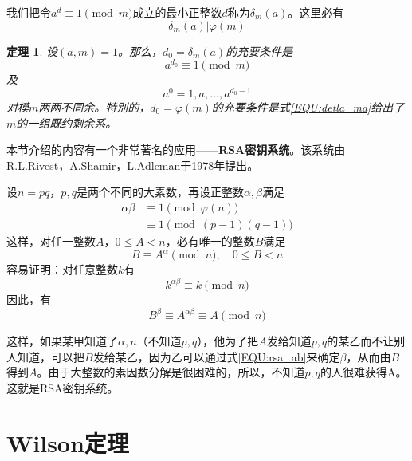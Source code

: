 \documentclass{ctexrep}
\newcommand{\bbold}[1]{\textbf{#1}}
\newtheorem{thrm}{定理}[section]
\begin{document}
我们把令$a^d\equiv 1\pmod{m}$成立的最小正整数$d$称为$\delta_m(a)$。这里必有
\begin{displaymath}
\delta_m(a)|\varphi(m)
\end{displaymath}

\begin{thrm}
设$(a,m)=1$。那么，$d_0=\delta_m(a)$的充要条件是
\begin{equation}
a^{d_0}\equiv 1\pmod{m}
\end{equation}
及
\begin{equation}\label{EQU:detla_ma}
a^0=1,a,\dotsc,a^{d_0-1}
\end{equation}
对模$m$两两不同余。特别的，$d_0=\varphi(m)$的充要条件是式\ref{EQU:detla_ma}给出了$m$的一组既约剩余系。
\end{thrm}

本节介绍的内容有一个非常著名的应用——\bbold{RSA密钥系统}。该系统由R.L.Rivest，A.Shamir，L.Adleman于1978年提出。

设$n=pq$，$p,q$是两个不同的大素数，再设正整数$\alpha,\beta$满足
\begin{align}\label{EQU:rsa_ab}
\alpha\beta&\equiv 1\pmod{\varphi(n)}\nonumber\\
           &\equiv 1\pmod{(p-1)(q-1)}
\end{align}
这样，对任一整数$A$，$0\leq A<n$，必有唯一的整数$B$满足
\begin{displaymath}
B\equiv A^\alpha\pmod{n},\quad 0\leq B<n
\end{displaymath}
容易证明：对任意整数$k$有
\begin{displaymath}
k^{\alpha\beta}\equiv k\pmod{n}
\end{displaymath}
因此，有
\begin{displaymath}
B^{\beta}\equiv A^{\alpha\beta}\equiv A\pmod{n}
\end{displaymath}

这样，如果某甲知道了$\alpha,n$（不知道$p,q$），他为了把$A$发给知道$p,q$的某乙而不让别人知道，可以把$B$发给某乙，因为乙可以通过式\ref{EQU:rsa_ab}来确定$\beta$，从而由$B$得到$A$。由于大整数的素因数分解是很困难的，所以，不知道$p,q$的人很难获得A。这就是RSA密钥系统。

\section{Wilson定理}
\end{document}

